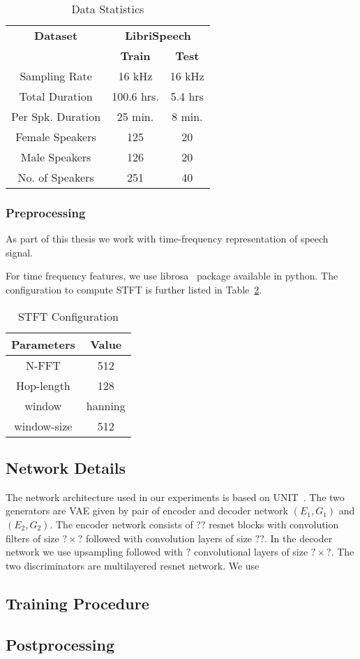 \begin{table}[]
    \centering
    \begin{tabular}{c|cc}
    \toprule
    \textbf{Dataset} & \multicolumn{2}{c}{\textbf{LibriSpeech}}\\
    \cmidrule{2-3}
        & \textbf{Train} & \textbf{Test} \\
    \midrule
        Sampling Rate & 16 kHz & 16 kHz\\
        Total Duration &  100.6 hrs. & 5.4 hrs\\
        Per Spk. Duration & 25 min. & 8 min.\\
        Female Speakers & 125 & 20\\
        Male Speakers & 126 & 20\\
        No. of Speakers & 251 & 40\\
    \end{tabular}
    \caption{Data Statistics}
    \label{tab:data_stat}
\end{table}



\subsubsection{Preprocessing}
\label{subsec:preprocess}
As part of this thesis we work with time-frequency representation of speech signal. 

For time frequency features, we use librosa~\cite{??} package available in python. The configuration to compute STFT is further listed in Table~\ref{tab:stft}. 




\begin{table}[]
    \centering
    \begin{tabular}{c|c}
    \toprule
    \textbf{Parameters} & \textbf{Value}\\
    \midrule
         N-FFT&  512\\
         Hop-length& 128\\
         window& hanning\\
         window-size& 512\\
    \bottomrule     
    \end{tabular}
    \caption{STFT Configuration}
    \label{tab:stft}
\end{table}
\subsection{Network Details}
\label{sec:network_details}
The network architecture used in our experiments is based on UNIT~\cite{zhu2017unpaired}. The two generators are VAE given by pair of encoder and decoder network $(E_1,G_1)$ and $(E_2,G_2)$. The encoder network consists of ?? resnet blocks with convolution filters of size $?\times?$ followed with convolution layers of size $??$. In the decoder network we use upsampling followed with $?$ convolutional layers of size $?\times ?$. The two discriminators are multilayered resnet network. We use
\subsection{Training Procedure}

\subsection{Postprocessing}


